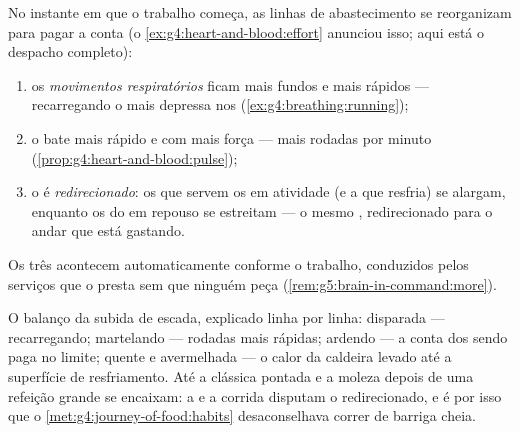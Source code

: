 \begin{proposition}\label{prop:g7:organs-at-work:supply}
No instante em que o trabalho começa, as linhas de abastecimento se
reorganizam para pagar a conta (o
\cref{ex:g4:heart-and-blood:effort} anunciou isso; aqui está o
despacho completo):
\begin{enumerate}
  \item os \emph{movimentos respiratórios} ficam mais fundos e mais
        rápidos --- recarregando o  mais depressa nos 
        (\cref{ex:g4:breathing:running});
  \item o \emph{} bate mais rápido e com mais força --- mais
        rodadas por minuto
        (\cref{prop:g4:heart-and-blood:pulse});
  \item o  é \emph{redirecionado}: os  que servem os
         em atividade (e a  que resfria) se alargam,
        enquanto os do  em repouso se estreitam --- o
        mesmo , redirecionado para o andar que está gastando.
\end{enumerate}
Os três acontecem automaticamente conforme o trabalho, conduzidos
pelos serviços que o  presta sem que ninguém peça
(\cref{rem:g5:brain-in-command:more}).
\end{proposition}
\admitted

\begin{example}\label{ex:g7:organs-at-work:felt}
O balanço da subida de escada, explicado linha por linha: 
disparada --- recarregando;  martelando --- rodadas mais
rápidas;  ardendo --- a conta dos  sendo paga no limite;
 quente e avermelhada --- o calor da caldeira levado até a
superfície de resfriamento. Até a clássica pontada e a moleza depois de
uma refeição grande se encaixam: a  e a corrida disputam o
 redirecionado, e é por isso que o
\cref{met:g4:journey-of-food:habits} desaconselhava correr de barriga
cheia.
\end{example}

